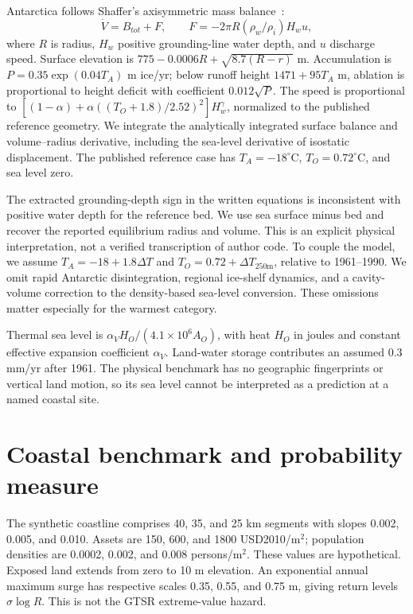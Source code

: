 \documentclass[11pt]{article}
\begin{document}
Antarctica follows Shaffer's axisymmetric mass balance\ \cite{shaffer}:
\begin{equation}
\dot V=B_{tot}+F,\qquad
F=-2\pi R(\rho_w/\rho_i)H_w u,
\end{equation}
where $R$ is radius, $H_w$ positive grounding-line water depth, and $u$ discharge
speed. Surface elevation is $775-0.0006R+\sqrt{8.7(R-r)}$ m. Accumulation
is $P=0.35\exp(0.04T_A)$ m ice/yr; below runoff height $1471+95T_A$ m,
ablation is proportional to height deficit with coefficient $0.012\sqrt P$.
The speed is proportional to
$[(1-\alpha)+\alpha((T_O+1.8)/2.52)^2]H_w^\gamma$,
normalized to the published reference geometry. We integrate the analytically
integrated surface balance and volume--radius derivative, including the
sea-level derivative of isostatic displacement. The published reference case
has $T_A=-18^\circ$C, $T_O=0.72^\circ$C, and sea level zero.

The extracted grounding-depth sign in the written equations is inconsistent
with positive water depth for the reference bed. We use sea surface minus bed
and recover the reported equilibrium radius and volume. This is an explicit
physical interpretation, not a verified transcription of author code.
To couple the model, we assume $T_A=-18+1.8\Delta T$ and
$T_O=0.72+\Delta T_{250\mathrm m}$, relative to 1961--1990. We omit rapid
Antarctic disintegration, regional ice-shelf dynamics, and a cavity-volume
correction to the density-based sea-level conversion. These omissions matter
especially for the warmest category.

Thermal sea level is $\alpha_V H_O/(4.1\times10^6 A_O)$, with heat $H_O$ in
joules and constant effective expansion coefficient $\alpha_V$. Land-water
storage contributes an assumed 0.3 mm/yr after 1961. The physical benchmark
has no geographic fingerprints or vertical land motion, so its sea level
cannot be interpreted as a prediction at a named coastal site.

\section{Coastal benchmark and probability measure}
The synthetic coastline comprises 40, 35, and 25 km segments with slopes
0.002, 0.005, and 0.010. Assets are 150, 600, and 1800 USD2010/m$^2$; population
densities are 0.0002, 0.002, and 0.008 persons/m$^2$. These values are
hypothetical. Exposed land extends from zero to 10 m elevation. An exponential
annual maximum surge has respective scales 0.35, 0.55, and 0.75 m, giving
return levels $\sigma\log R$. This is not the GTSR extreme-value hazard.
\end{document}
